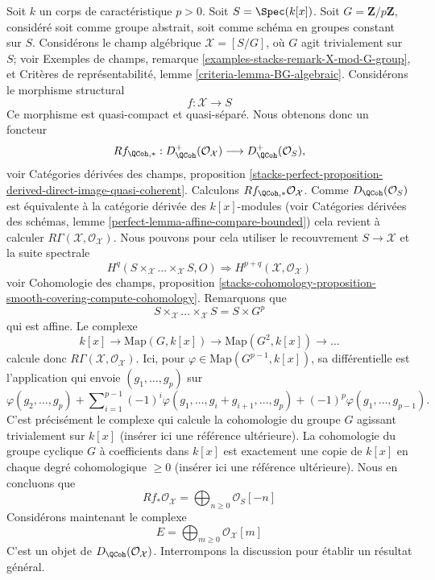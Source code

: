 \noindent
Soit $k$ un corps de caractéristique $p > 0$. Soit $S = \Spec(k[x])$.
Soit $G = \mathbf{Z}/p\mathbf{Z}$, considéré soit comme groupe abstrait,
soit comme schéma en groupes constant sur $S$. Considérons le champ algébrique
$\mathcal{X} = [S/G]$, où $G$ agit trivialement sur $S$; voir
Exemples de champs, remarque \ref{examples-stacks-remark-X-mod-G-group},
et
Critères de représentabilité, lemme \ref{criteria-lemma-BG-algebraic}.
Considérons le morphisme structural
$$
f : \mathcal{X} \longrightarrow S
$$
Ce morphisme est quasi-compact et quasi-séparé. Nous obtenons donc un foncteur
$$
Rf_{\QCoh, *} :
D^{+}_\QCoh(\mathcal{O}_\mathcal{X})
\longrightarrow
D^{+}_\QCoh(\mathcal{O}_S),
$$
voir
Catégories dérivées des champs, proposition
\ref{stacks-perfect-proposition-derived-direct-image-quasi-coherent}.
Calculons $Rf_{\QCoh, *}\mathcal{O}_\mathcal{X}$.
Comme $D_\QCoh(\mathcal{O}_S)$ est équivalente à
la catégorie dérivée des $k[x]$-modules (voir
Catégories dérivées des schémas, lemme
\ref{perfect-lemma-affine-compare-bounded})
cela revient à calculer
$R\Gamma(\mathcal{X}, \mathcal{O}_\mathcal{X})$.
Nous pouvons pour cela utiliser le recouvrement $S \to \mathcal{X}$ et la suite
spectrale
$$
H^q(S \times_\mathcal{X} \ldots \times_\mathcal{X} S, O)
\Rightarrow H^{p + q}(\mathcal{X}, \mathcal{O}_\mathcal{X})
$$
voir
Cohomologie des champs, proposition
\ref{stacks-cohomology-proposition-smooth-covering-compute-cohomology}.
Remarquons que
$$
S \times_\mathcal{X} \ldots \times_\mathcal{X} S = S \times G^p
$$
qui est affine. Le complexe
$$
k[x] \to \text{Map}(G, k[x]) \to \text{Map}(G^2, k[x]) \to \ldots
$$
calcule donc $R\Gamma(\mathcal{X}, \mathcal{O}_\mathcal{X})$.
Ici, pour $\varphi \in \text{Map}(G^{p - 1}, k[x])$, sa différentielle est
l'application qui envoie $(g_1, \ldots, g_p)$ sur
$$
\varphi(g_2, \ldots, g_p) +
\sum\nolimits_{i = 1}^{p - 1}
(-1)^i\varphi(g_1, \ldots, g_i + g_{i + 1}, \ldots, g_p)
+ (-1)^p\varphi(g_1, \ldots, g_{p - 1}).
$$
C'est précisément le complexe qui calcule la cohomologie du groupe $G$ agissant
trivialement sur $k[x]$ (insérer ici une référence ultérieure). La cohomologie
du groupe cyclique $G$ à coefficients dans $k[x]$ est exactement une copie de $k[x]$ en chaque
degré cohomologique $\geq 0$ (insérer ici une référence ultérieure). Nous en concluons
que
$$
Rf_*\mathcal{O}_\mathcal{X} = \bigoplus\nolimits_{n \geq 0} \mathcal{O}_S[-n]
$$
Considérons maintenant le complexe
$$
E = \bigoplus\nolimits_{m \geq 0} \mathcal{O}_\mathcal{X}[m]
$$
C'est un objet de $D_\QCoh(\mathcal{O}_\mathcal{X})$. Interrompons la
discussion pour établir un résultat général.

